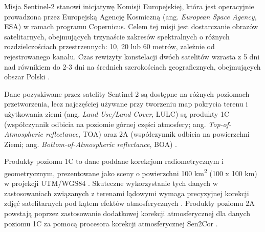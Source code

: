 \documentclass{amuthesis}
\begin{document}
Misja Sentinel-2 stanowi inicjatywę Komisji Europejskiej, która jest
operacyjnie prowadzona przez Europejską Agencję Kosmiczną (ang.
\emph{European Space Agency}, ESA) w ramach programu Copernicus. Celem
tej misji jest dostarczanie obrazów satelitarnych, obejmujących
trzynaście zakresów spektralnych o różnych rozdzielczościach
przestrzennych: 10, 20 lub 60 metrów, zależnie od rejestrowanego kanału.
Czas rewizyty konstelacji dwóch satelitów wzrasta z 5 dni nad równikiem
do 2-3 dni na średnich szerokościach geograficznych, obejmujących obszar
Polski \autocite{hejmanowska_2020_dane,sentinel_2_guide}.

Dane pozyskiwane przez satelity Sentinel-2 są dostępne na różnych
poziomach przetworzenia, lecz najczęściej używane przy tworzeniu map
pokrycia terenu i użytkowania ziemi (ang. \emph{Land Use/Land Cover},
LULC) są produkty 1C (współczynnik odbicia na poziomie górnej części
atmosfery; ang. \emph{Top-of-Atmospheric reflectance}, TOA) oraz 2A
(współczynnik odbicia na powierzchni Ziemi; ang.
\emph{Bottom-of-Atmospheric reflectance}, BOA)
\autocite{phiri_2020_sentinel2}.

Produkty poziomu 1C to dane poddane korekcjom radiometrycznym i
geometrycznym, prezentowane jako sceny o powierzchni 100
km\textsuperscript{2} (100 x 100 km) w projekcji UTM/WGS84
\autocite{esa_2015_sentinel2handbook}. Skuteczne wykorzystanie tych
danych w zastosowaniach związanych z terenami lądowymi wymaga
precyzyjnej korekcji zdjęć satelitarnych pod kątem efektów
atmosferycznych \autocite{main-knorn_2017_Sen2Cor}. Produkty poziomu 2A
powstają poprzez zastosowanie dodatkowej korekcji atmosferycznej dla
danych poziomu 1C za pomocą procesora korekcji atmosferycznej Sen2Cor
\autocite{main-knorn_2017_Sen2Cor}.
\end{document}
